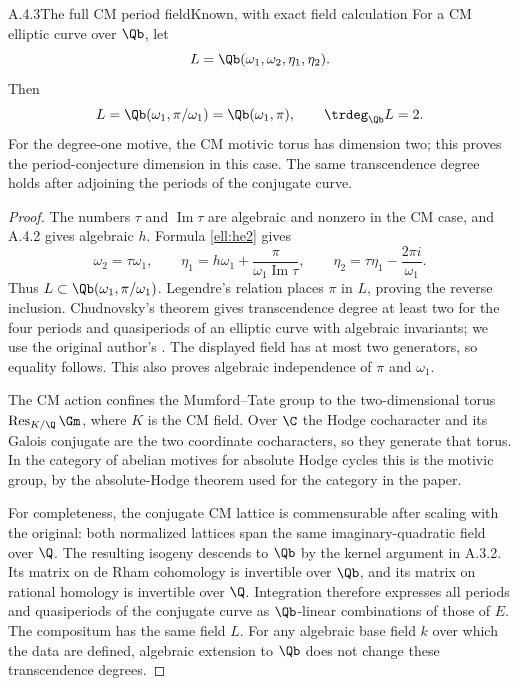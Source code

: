 \begin{result}{A.4.3}{The full CM period field}{Known, with exact field calculation}
For a CM elliptic curve over $\Qb$, let
\[
 L=\Qb(\omega_1,\omega_2,\eta_1,\eta_2).
\]
Then
\[
 L=\Qb(\omega_1,\pi/\omega_1)=\Qb(\omega_1,\pi),
 \qquad \trdeg_{\Qb}L=2.
\]
For the degree-one motive, the CM motivic torus has dimension two; this proves the period-conjecture dimension in this case. The same transcendence degree holds after adjoining the periods of the conjugate curve.
\end{result}
\begin{proof}
The numbers $\tau$ and $\operatorname{Im}\tau$ are algebraic and nonzero in the CM case, and A.4.2 gives algebraic $h$. Formula \eqref{ell:he2} gives
\[
 \omega_2=\tau\omega_1,\qquad
 \eta_1=h\omega_1+\frac{\pi}{\omega_1\operatorname{Im}\tau},
 \qquad \eta_2=\tau\eta_1-\frac{2\pi i}{\omega_1}.
\]
Thus $L\subset\Qb(\omega_1,\pi/\omega_1)$. Legendre's relation places $\pi$ in $L$, proving the reverse inclusion. Chudnovsky's theorem gives transcendence degree at least two for the four periods and quasiperiods of an elliptic curve with algebraic invariants; we use the original author's \cite[\S2A, Theorem 1, p.343, with the algebraic-invariant convention on p.339]{EllChudnovsky1978}. The displayed field has at most two generators, so equality follows. This also proves algebraic independence of $\pi$ and $\omega_1$.

The CM action confines the Mumford--Tate group to the two-dimensional torus $\operatorname{Res}_{K/\Q}\Gm$, where $K$ is the CM field. Over $\C$ the Hodge cocharacter and its Galois conjugate are the two coordinate cocharacters, so they generate that torus. In the category of abelian motives for absolute Hodge cycles this is the motivic group, by the absolute-Hodge theorem used for the category in the paper.

For completeness, the conjugate CM lattice is commensurable after scaling with the original: both normalized lattices span the same imaginary-quadratic field over $\Q$. The resulting isogeny descends to $\Qb$ by the kernel argument in A.3.2. Its matrix on de Rham cohomology is invertible over $\Qb$, and its matrix on rational homology is invertible over $\Q$. Integration therefore expresses all periods and quasiperiods of the conjugate curve as $\Qb$-linear combinations of those of $E$. The compositum has the same field $L$. For any algebraic base field $k$ over which the data are defined, algebraic extension to $\Qb$ does not change these transcendence degrees.
\end{proof}

